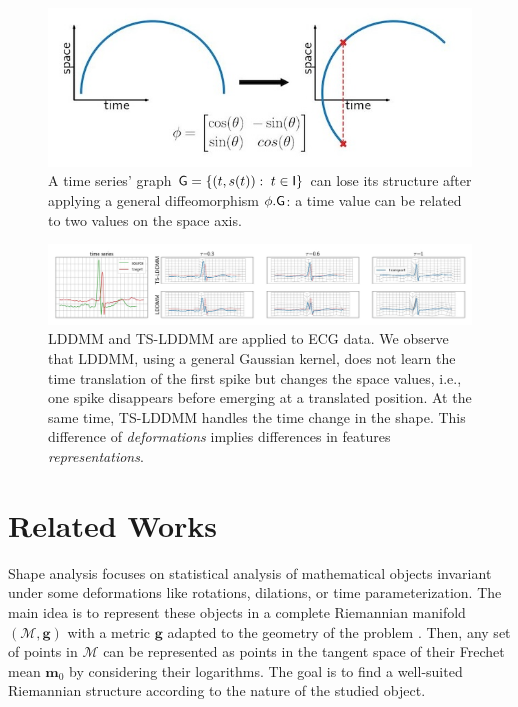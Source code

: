 \begin{figure}[t]
  \centering
  \includegraphics[width=0.7\linewidth]{"./pictures/diffeo.jpeg"}
  
  \caption{A time series' graph $\mathsf{G}=\{(t,s(t)): \; t\in\mathsf{I}\} $ can lose its structure after applying a general diffeomorphism $\phi.\mathsf{G}$: a time value can be related to two values on the space axis.}
  \label{fig:diffeo}
  
\end{figure}

\begin{figure}[t]
  \centering
  \includegraphics[width=\linewidth]{"./pictures/transport.jpeg"}
  
  \caption{LDDMM and TS-LDDMM are applied to ECG data.
  We observe that LDDMM, using a general Gaussian kernel, does not learn the time translation of the first spike but changes the space values, i.e., one spike disappears before emerging at a translated position. At the same time, TS-LDDMM handles the time change in the shape.
  This difference of \textit{deformations} implies differences in features \textit{representations}.   }
  \label{fig:transport}
  
\end{figure}

\section{Related Works}
Shape analysis focuses on statistical analysis of mathematical objects invariant under some deformations like rotations, dilations, or time parameterization.
   The main idea is to represent these objects in a complete Riemannian manifold $(\mathcal{M},\mathbf{g})$ with a metric $\mathbf{g}$ adapted to the geometry of the problem \cite{miller2006geodesic}.
    Then, any set of points in $\mathcal{M}$ can be represented as points in the tangent space of their Frechet mean $\mathbf{m}_0$ \cite{pal2017riemannian,le2001locating} by considering their logarithms.
     The goal is to find a well-suited Riemannian structure according to the nature of the studied object.
     
